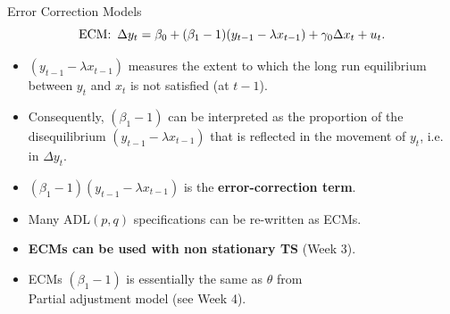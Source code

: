 \documentclass{beamer}
\begin{document}
\begin{frame}{Error Correction Models}
\begin{equation*} 
\textnormal{ECM:} \, \, \, \Delta y_t = \beta_0 + (\beta_1 -1) ( y_{t-1} - \lambda x_{t-1} ) + 
         \gamma_0 \Delta x_t + u_t.
\end{equation*}

\begin{itemize}
\item $( y_{t-1} - \lambda x_{t-1} )$ measures the extent to which the long run equilibrium between $y_t$ and $x_t$ is not satisfied (at $t-1$).
\item Consequently, $(\beta_1 -1)$ can be interpreted as the proportion of the disequilibrium $( y_{t-1} - \lambda x_{t-1} )$ that is reflected in the movement of $y_t$, i.e. in $\Delta y_t$.
\item $(\beta_1 -1)( y_{t-1} - \lambda x_{t-1} )$ is the \textbf{error-correction term}.
\item Many ADL$(p,q)$ specifications can be re-written as ECMs.
\item \textbf{ECMs can be used with non stationary TS} (Week 3).
\item ECMs $(\beta_1 -1)$ is essentially the same as $\theta$ from \\Partial adjustment model (see Week 4).
\end{itemize}
\end{frame}
\end{document}
